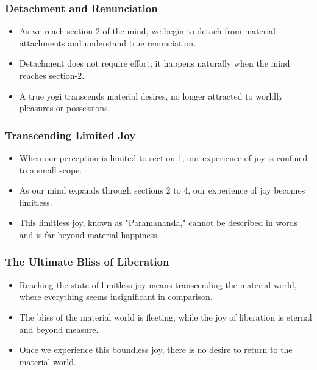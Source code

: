 \begin{frame}[fragile]\frametitle{Detachment and Renunciation}
    \begin{itemize}
        \item As we reach section-2 of the mind, we begin to detach from material attachments and understand true renunciation.
        \item Detachment does not require effort; it happens naturally when the mind reaches section-2.
        \item A true yogi transcends material desires, no longer attracted to worldly pleasures or possessions.
    \end{itemize}
\end{frame}

\begin{frame}[fragile]\frametitle{Transcending Limited Joy}
    \begin{itemize}
        \item When our perception is limited to section-1, our experience of joy is confined to a small scope.
        \item As our mind expands through sections 2 to 4, our experience of joy becomes limitless.
        \item This limitless joy, known as "Paramananda," cannot be described in words and is far beyond material happiness.
    \end{itemize}
\end{frame}

\begin{frame}[fragile]\frametitle{The Ultimate Bliss of Liberation}
    \begin{itemize}
        \item Reaching the state of limitless joy means transcending the material world, where everything seems insignificant in comparison.
        \item The bliss of the material world is fleeting, while the joy of liberation is eternal and beyond measure.
        \item Once we experience this boundless joy, there is no desire to return to the material world.
    \end{itemize}
\end{frame}

